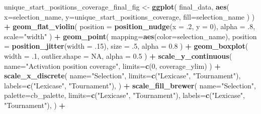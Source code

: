 \documentclass[]{book}
\newenvironment{Shaded}{\begin{snugshade}}{\end{snugshade}}
\newcommand{\DataTypeTok}[1]{\textcolor[rgb]{0.13,0.29,0.53}{#1}}
\newcommand{\DecValTok}[1]{\textcolor[rgb]{0.00,0.00,0.81}{#1}}
\newcommand{\FloatTok}[1]{\textcolor[rgb]{0.00,0.00,0.81}{#1}}
\newcommand{\KeywordTok}[1]{\textcolor[rgb]{0.13,0.29,0.53}{\textbf{#1}}}
\newcommand{\NormalTok}[1]{#1}
\newcommand{\OperatorTok}[1]{\textcolor[rgb]{0.81,0.36,0.00}{\textbf{#1}}}
\newcommand{\OtherTok}[1]{\textcolor[rgb]{0.56,0.35,0.01}{#1}}
\newcommand{\StringTok}[1]{\textcolor[rgb]{0.31,0.60,0.02}{#1}}
\begin{document}
\begin{Shaded}
\begin{Highlighting}[]
\NormalTok{unique_start_positions_coverage_final_fig <-}\StringTok{ }\KeywordTok{ggplot}\NormalTok{(}
\NormalTok{    final_data,}
    \KeywordTok{aes}\NormalTok{(}
      \DataTypeTok{x=}\NormalTok{selection_name,}
      \DataTypeTok{y=}\NormalTok{unique_start_positions_coverage,}
      \DataTypeTok{fill=}\NormalTok{selection_name}
\NormalTok{    )}
\NormalTok{  ) }\OperatorTok{+}
\StringTok{  }\KeywordTok{geom_flat_violin}\NormalTok{(}
    \DataTypeTok{position =} \KeywordTok{position_nudge}\NormalTok{(}\DataTypeTok{x =} \FloatTok{.2}\NormalTok{, }\DataTypeTok{y =} \DecValTok{0}\NormalTok{),}
    \DataTypeTok{alpha =} \FloatTok{.8}\NormalTok{,}
    \DataTypeTok{scale=}\StringTok{"width"}
\NormalTok{  ) }\OperatorTok{+}
\StringTok{  }\KeywordTok{geom_point}\NormalTok{(}
    \DataTypeTok{mapping=}\KeywordTok{aes}\NormalTok{(}\DataTypeTok{color=}\NormalTok{selection_name),}
    \DataTypeTok{position =} \KeywordTok{position_jitter}\NormalTok{(}\DataTypeTok{width =} \FloatTok{.15}\NormalTok{),}
    \DataTypeTok{size =} \FloatTok{.5}\NormalTok{,}
    \DataTypeTok{alpha =} \FloatTok{0.8}
\NormalTok{  ) }\OperatorTok{+}
\StringTok{  }\KeywordTok{geom_boxplot}\NormalTok{(}
    \DataTypeTok{width =} \FloatTok{.1}\NormalTok{,}
    \DataTypeTok{outlier.shape =} \OtherTok{NA}\NormalTok{,}
    \DataTypeTok{alpha =} \FloatTok{0.5}
\NormalTok{  ) }\OperatorTok{+}
\StringTok{  }\KeywordTok{scale_y_continuous}\NormalTok{(}
    \DataTypeTok{name=}\StringTok{"Activation position coverage"}\NormalTok{,}
    \DataTypeTok{limits=}\KeywordTok{c}\NormalTok{(}\DecValTok{0}\NormalTok{, coverage_ylim)}
\NormalTok{  ) }\OperatorTok{+}
\StringTok{  }\KeywordTok{scale_x_discrete}\NormalTok{(}
    \DataTypeTok{name=}\StringTok{"Selection"}\NormalTok{,}
    \DataTypeTok{limits=}\KeywordTok{c}\NormalTok{(}\StringTok{"Lexicase"}\NormalTok{, }\StringTok{"Tournament"}\NormalTok{),}
    \DataTypeTok{labels=}\KeywordTok{c}\NormalTok{(}\StringTok{"Lexicase"}\NormalTok{, }\StringTok{"Tournament"}\NormalTok{),}
\NormalTok{  ) }\OperatorTok{+}
\StringTok{  }\KeywordTok{scale_fill_brewer}\NormalTok{(}
    \DataTypeTok{name=}\StringTok{"Selection"}\NormalTok{,}
    \DataTypeTok{palette=}\NormalTok{cb_palette,}
    \DataTypeTok{limits=}\KeywordTok{c}\NormalTok{(}\StringTok{"Lexicase"}\NormalTok{, }\StringTok{"Tournament"}\NormalTok{),}
    \DataTypeTok{labels=}\KeywordTok{c}\NormalTok{(}\StringTok{"Lexicase"}\NormalTok{, }\StringTok{"Tournament"}\NormalTok{),}
\NormalTok{  ) }\OperatorTok{+}

\end{Highlighting}
\end{Shaded}
\end{document}
